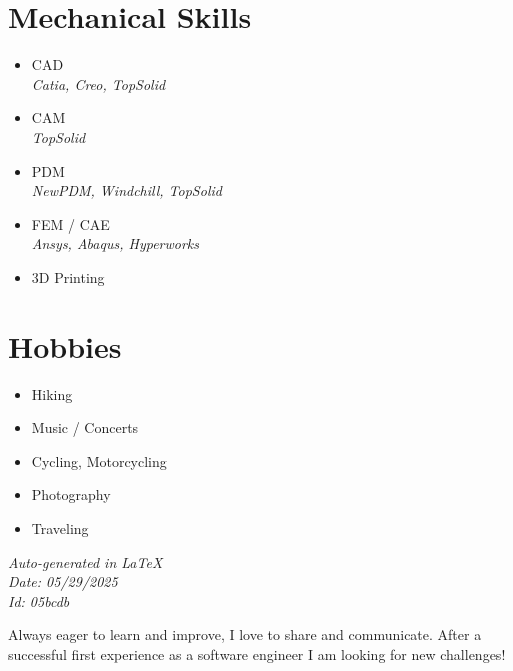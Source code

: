 \documentclass[]{friggeri-cv}
\begin{document}
\begin{aside}
\section{Mechanical Skills}
\begin{itemize}
\item CAD
 \\ \hspace*{0.2em}\small\textit{Catia, Creo, TopSolid}
\item CAM
 \\ \hspace*{0.2em}\small\textit{TopSolid}
\item PDM
 \\ \hspace*{0.2em}\small\textit{NewPDM, Windchill, TopSolid}
\item FEM / CAE
 \\ \hspace*{0.2em}\small\textit{Ansys, Abaqus, Hyperworks}
\item 3D Printing
\end{itemize}
\section{Hobbies}
\begin{itemize}
\item Hiking
\item Music / Concerts
\item Cycling, Motorcycling
\item Photography
\item Traveling
\end{itemize}
\vspace{2.5mm}%
\small \emph{Auto-generated in \LaTeX}\\
\small \emph{Date: 05/29/2025} \hspace*{8mm}\\
\small \emph{Id: 05bcdb} %

\end{aside}

\vspace*{-2.0mm}
\noindent\parbox{\linewidth}{
  \centering
  Always eager to learn and improve, I love to share and communicate. After a successful first experience as a software engineer I am looking for new challenges!
}
\vspace*{0.8mm}
\end{document}
